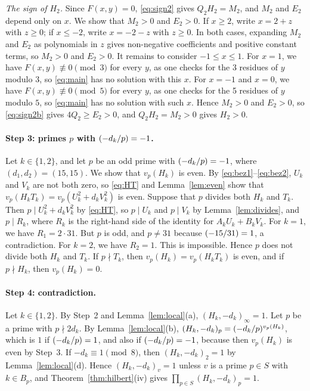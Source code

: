 \documentclass[11pt]{article}
\newcommand{\leg}[2]{\mathchoice{\biggl(\dfrac{#1}{#2}\biggr)}{(#1/#2)}{(#1/#2)}{(#1/#2)}}
\begin{document}
\emph{The sign of $H_{2}$.} Since $F(x,y)=0$, \eqref{eq:sign2} gives $Q_{2}H_{2}=M_{2}$, and $M_{2}$ and $E_{2}$ depend only on $x$. We show that $M_{2}>0$ and $E_{2}>0$. If $x\geq2$, write $x=2+z$ with $z\geq0$; if $x\leq-2$, write $x=-2-z$ with $z\geq0$. In both cases, expanding $M_{2}$ and $E_{2}$ as polynomials in $z$ gives non-negative coefficients and positive constant terms, so $M_{2}>0$ and $E_{2}>0$. It remains to consider $-1\leq x\leq1$. For $x=1$, we have $F(x,y)\not\equiv0\pmod{3}$ for every $y$, as one checks for the 3 residues of $y$ modulo $3$, so \eqref{eq:main} has no solution with this $x$. For $x=-1$ and $x=0$, we have $F(x,y)\not\equiv0\pmod{5}$ for every $y$, as one checks for the 5 residues of $y$ modulo $5$, so \eqref{eq:main} has no solution with such $x$. Hence $M_{2}>0$ and $E_{2}>0$, so \eqref{eq:sign2b} gives $4Q_{2}\geq E_{2}>0$, and $Q_{2}H_{2}=M_{2}>0$ gives $H_{2}>0$.

\paragraph{Step 3: primes $p$ with $\leg{-d_k}{p}=-1$.} Let $k\in\{1,2\}$, and let $p$ be an odd prime with $\leg{-d_k}{p}=-1$, where $(d_{1},d_{2})=(15,15)$. We show that $v_p(H_k)$ is even. By \eqref{eq:bez1}--\eqref{eq:bez2}, $U_k$ and $V_k$ are not both zero, so \eqref{eq:HT} and Lemma~\ref{lem:even} show that $v_p(H_kT_k)=v_p(U_k^2+d_kV_k^2)$ is even. Suppose that $p$ divides both $H_k$ and $T_k$. Then $p\mid U_k^2+d_kV_k^2$ by \eqref{eq:HT}, so $p\mid U_k$ and $p\mid V_k$ by Lemma~\ref{lem:divides}, and $p\mid R_k$, where $R_k$ is the right-hand side of the identity for $A_kU_k+B_kV_k$. For $k=1$, we have $R_{1}=2\cdot 31$. But $p$ is odd, and $p\neq31$ because $\leg{-15}{31}=1$, a contradiction. For $k=2$, we have $R_{2}=1$. This is impossible. Hence $p$ does not divide both $H_k$ and $T_k$. If $p\nmid T_k$, then $v_p(H_k)=v_p(H_kT_k)$ is even, and if $p\nmid H_k$, then $v_p(H_k)=0$.

\paragraph{Step 4: contradiction.} Let $k\in\{1,2\}$. By Step~2 and Lemma~\ref{lem:local}(a), $(H_k,-d_k)_\infty=1$. Let $p$ be a prime with $p\nmid2d_k$. By Lemma~\ref{lem:local}(b), $(H_k,-d_k)_p=\leg{-d_k}{p}^{v_p(H_k)}$, which is $1$ if $\leg{-d_k}{p}=1$, and also if $\leg{-d_k}{p}=-1$, because then $v_p(H_k)$ is even by Step~3. If $-d_k\equiv1\pmod8$, then $(H_k,-d_k)_2=1$ by Lemma~\ref{lem:local}(d). Hence $(H_k,-d_k)_v=1$ unless $v$ is a prime $p\in S$ with $k\in B_p$, and Theorem~\ref{thm:hilbert}(iv) gives $\prod_{p\in S}(H_k,-d_k)_p=1$.
\end{document}
